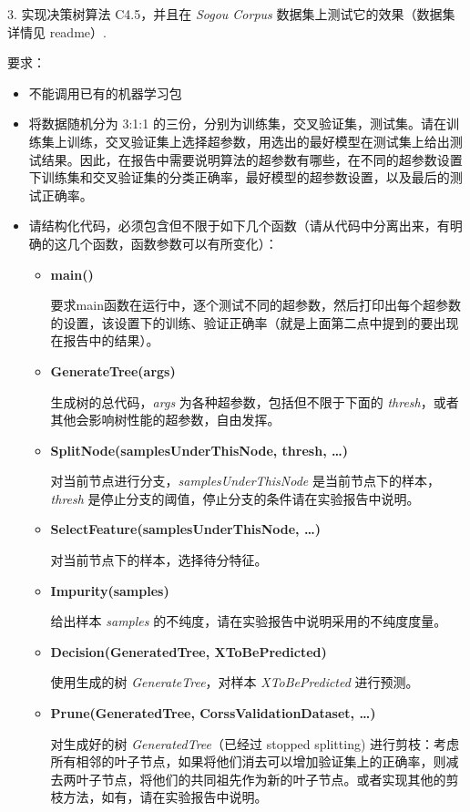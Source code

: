\documentclass[openany]{ctexbook}
\theoremstyle{kaiti}
\theoremstyle{normal}
\begin{document}
3. 实现决策树算法 C4.5，并且在 \emph{Sogou Corpus} 数据集上测试它的效果（数据集详情见 readme）. 

要求：
\begin{itemize}
  \item 不能调用已有的机器学习包
  \item 将数据随机分为 3:1:1 的三份，分别为训练集，交叉验证集，测试集。请在训练集上训练，交叉验证集上选择超参数，用选出的最好模型在测试集上给出测试结果。因此，在报告中需要说明算法的超参数有哪些，在不同的超参数设置下训练集和交叉验证集的分类正确率，最好模型的超参数设置，以及最后的测试正确率。
  \item 请结构化代码，必须包含但不限于如下几个函数（请从代码中分离出来，有明确的这几个函数，函数参数可以有所变化）：
  \begin{itemize}
    \item \textbf{main()}

      要求main函数在运行中，逐个测试不同的超参数，然后打印出每个超参数的设置，该设置下的训练、验证正确率（就是上面第二点中提到的要出现在报告中的结果）。

    \item \textbf{GenerateTree(args)}

        生成树的总代码，\emph{args} 为各种超参数，包括但不限于下面的 \emph{thresh}，或者其他会影响树性能的超参数，自由发挥。

    \item \textbf{SplitNode(samplesUnderThisNode, thresh, \dots)}

        对当前节点进行分支，\emph{samplesUnderThisNode} 是当前节点下的样本，\emph{thresh} 是停止分支的阈值，停止分支的条件请在实验报告中说明。

    \item \textbf{SelectFeature(samplesUnderThisNode, \dots)}

        对当前节点下的样本，选择待分特征。

    \item \textbf{Impurity(samples)}

        给出样本 \emph{samples} 的不纯度，请在实验报告中说明采用的不纯度度量。

    \item \textbf{Decision(GeneratedTree, XToBePredicted)}

        使用生成的树 \emph{GenerateTree}，对样本 \emph{XToBePredicted} 进行预测。

    \item \textbf{Prune(GeneratedTree, CorssValidationDataset, \dots)}

        对生成好的树 \emph{GeneratedTree}（已经过 stopped splitting) 进行剪枝：考虑所有相邻的叶子节点，如果将他们消去可以增加验证集上的正确率，则减去两叶子节点，将他们的共同祖先作为新的叶子节点。或者实现其他的剪枝方法，如有，请在实验报告中说明。

  \end{itemize}

\end{itemize}
\end{document}
